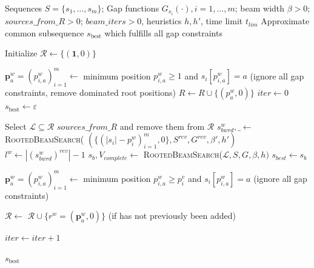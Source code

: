 \documentclass[runningheads]{llncs}
\begin{document}
 
 \begin{algorithm}[H]
 	\caption{Iterative Multi-source Beam Search (IMSBS) Framework }
 	\label{alg:imbs}
 	\begin{algorithmic}[1]
 		\Require Sequences $S=\{s_1, \dots, s_m\}$; Gap functions $G_{s_i}(\cdot),i=1,\ldots,m$; beam width $\beta>0$; ${sources\_from\_R}>0$; $beam\_iters>0$, heuristics $h, h'$, time limit $t_{{lim}}$
 		\Ensure Approximate common subsequence $s_{\textrm{best}}$ which fulfills all gap constraints
 		
 		\State Initialize $\mathcal{R} \gets \{ (\mathbf{1},0) \}$ 
 		
 		
 		 
 		\State $\textbf{p}^w_{a} = ({p}^w_{i, a})_{i=1}^m \gets$ minimum position  $p^w_{i, a} \geq 1$ and $s_i[p^w_{i, a}] = a$ (ignore all gap constraints, remove dominated root positions)
 		\State $R \gets R \cup \{ (p^w_a, 0)\}$
 		\EndFor
 		\State $iter \gets 0$
 		\State $s_{\textrm{best}} \gets  \varepsilon$
 		
 		\State Select $\mathcal{L} \subseteq \mathcal{R}$  ${sources\_from\_R}$  and remove them from $\mathcal{R}$ 
 		\State $s_{bwrd}^w, \_ \gets$ 
 		\textsc{RootedBeamSearch}(  
 		$(\{ (|s_i| - p^w_i)_{i=1}^m, 0\}, S^{rev}, G^{rev}, \beta', h')$
 		\State  $l^w \gets |(s_{bwrd}^w)^{rev}|-1$  
 		\EndFor
 		\State $s_{b}, V_{complete}
 		\gets$ 
 		\textsc{RootedBeamSearch}($\mathcal{L}, S, G, \beta, h)$ 
 		\State $s_{best} \gets s_b$
 		\EndIf
 		
 		
 		 
 		\State $\textbf{p}^w_{a}= ({p}^w_{i, a})_{i=1}^m \gets$ minimum position  $p^w_{i, a} \geq {p}_i^v$ and $s_i[p^w_{i, a}] = a$ (ignore all gap constraints)
 		
 		\State $\mathcal{R} \gets$ $\mathcal{R} \cup \{r^w = (\textbf{p}^w_a, 0)\}$   (if has not previously been  added) 
 		\EndFor
 		\EndFor
 		
 		\State $iter \gets iter + 1$
 		\EndWhile
 		
 		\State \Return $s_{\textrm{best}}$
 	\end{algorithmic}
 \end{algorithm}
 
\end{document}

